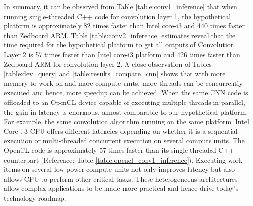 In summary, it can be observed from Table \ref{table:conv1_inference} that when running single-threaded C++ code for convolution layer 1, the hypothetical platform is approximately 82 times faster than Intel core-i3 and 440 times faster than Zedboard ARM. Table \ref{table:conv2_inference} estimates reveal that the time required for the hypothetical platform to get all outputs of Convolution Layer 2 is 57 times faster than Intel core-i3 platform and 426 times faster than Zedboard ARM for convolution layer 2. \newline \newline
A close observation of Tables \ref{table:dev_query} and \ref{table:results_compare_cnn} shows that with more memory to work on and more compute units, more threads can be concurrently executed and hence, more speedup can be achieved. \newline \newline
When the same CNN code is offloaded to an OpenCL device capable of executing multiple threads in parallel, the gain in latency is enormous, almost comparable to our hypothetical platform. For example, the same convolution algorithm running on the same platform, Intel Core i-3 CPU offers different latencies depending on whether it is a sequential execution or multi-threaded concurrent execution on several compute units. The OpenCL code is approximately 57 times faster than its single-threaded C++ counterpart (Reference: Table \ref{table:opencl_conv1_inference}). Executing work items on several low-power compute units not only improves latency but also allows CPU to perform other critical tasks. These heterogeneous architectures allow complex applications to be made more practical and hence drive today's technology roadmap.